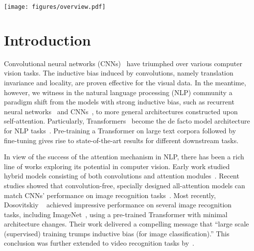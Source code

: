 \documentclass[10pt,twocolumn,letterpaper]{article}
\newcommand{\ours}{VATT\xspace}
\begin{document}
\begin{figure*}[t]
\centering
   \texttt{[image: figures/overview.pdf]}
   \caption{\textbf{Overview of the \ours architecture and the self-supervised, multimodal learning strategy}. VATT linearly projects each modality into a feature vector and feeds it into a Transformer encoder. We define a semantically hierarchical common space to account for the granularity of different modalities and employ the noise contrastive estimation to train the model.}
\label{fig:overview}
\vspace{-4mm}
\end{figure*}


\section{Introduction}
Convolutional neural networks (CNNs)~\cite{lecun1998gradient,krizhevsky2012imagenet} have triumphed over various computer vision tasks. The inductive bias induced by convolutions, namely translation invariance and locality, are proven effective for the visual data. In the meantime, however, we witness in the natural language processing (NLP) community a paradigm shift from the models with strong inductive bias, such as recurrent neural networks~\cite{hochreiter1997long,bahdanau2014neural} and CNNs~\cite{zhang2015character,gehring2017convolutional}, to more general architectures constructed upon self-attention. Particularly, Transformers~\cite{vaswani2017attention} become the de facto model architecture for NLP tasks~\cite{devlin2018bert,radford2018improving,radford2019language,brown2020language}. Pre-training a Transformer on large text corpora followed by fine-tuning gives rise to state-of-the-art results for different downstream tasks. 

In view of the success of the attention mechanism in NLP, there has been a rich line of works exploring its potential in computer vision. Early work studied hybrid models consisting of both convolutions and attention modules~\cite{wang2017residual,woo2018cbam,girdhar2017attentional,zhang2019residual}. Recent studies showed that convolution-free, specially designed all-attention models can match CNNs' performance on image recognition tasks~\cite{zhao2020exploring,hu2019local,ramachandran2019stand}. Most recently, Dosovitskiy \etal~\cite{dosovitskiy2021an} achieved impressive performance on several image recognition tasks, including ImageNet~\cite{deng2009imagenet}, using a pre-trained Transformer with minimal architecture changes. Their work delivered a compelling message that ``large scale (supervised) training trumps inductive bias (for image classification).'' This conclusion was further extended to video recognition tasks by~\cite{bertasius2021space,vivit}. 
\end{document}
